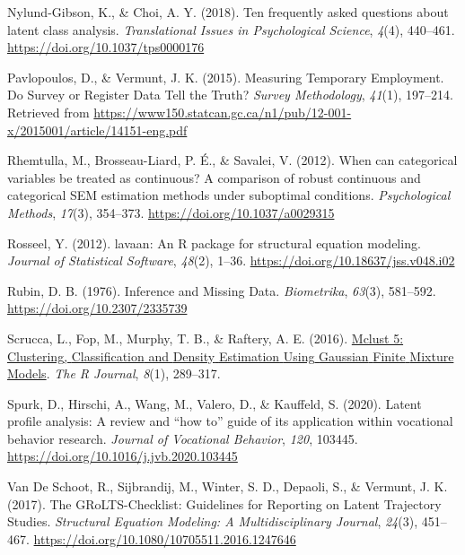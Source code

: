\documentclass[
  ,man,floatsintext]{apa6}
\newlength{\cslhangindent}
\newlength{\cslentryspacingunit} %
\newenvironment{CSLReferences}[2] %
 {%
  \setlength{\parindent}{0pt}
  \ifodd #1
  \let\oldpar\par
  \def\par{\hangindent=\cslhangindent\oldpar}
  \fi
  \setlength{\parskip}{#2\cslentryspacingunit}
 }%
 {}
\begin{document}
\begin{CSLReferences}{1}{0}
\leavevmode{}%
Nylund-Gibson, K., \& Choi, A. Y. (2018). Ten frequently asked questions about latent class analysis. \emph{Translational Issues in Psychological Science}, \emph{4}(4), 440--461. \url{https://doi.org/10.1037/tps0000176}

\leavevmode{}%
Pavlopoulos, D., \& Vermunt, J. K. (2015). Measuring {Temporary} {Employment}. {Do} {Survey} or {Register} {Data} {Tell} the {Truth}? \emph{Survey Methodology}, \emph{41}(1), 197--214. Retrieved from \url{https://www150.statcan.gc.ca/n1/pub/12-001-x/2015001/article/14151-eng.pdf}

\leavevmode{}%
Rhemtulla, M., Brosseau-Liard, P. É., \& Savalei, V. (2012). When can categorical variables be treated as continuous? {A} comparison of robust continuous and categorical {SEM} estimation methods under suboptimal conditions. \emph{Psychological Methods}, \emph{17}(3), 354--373. \url{https://doi.org/10.1037/a0029315}

\leavevmode{}%
Rosseel, Y. (2012). {lavaan}: An {R} package for structural equation modeling. \emph{Journal of Statistical Software}, \emph{48}(2), 1--36. \url{https://doi.org/10.18637/jss.v048.i02}

\leavevmode{}%
Rubin, D. B. (1976). Inference and {Missing} {Data}. \emph{Biometrika}, \emph{63}(3), 581--592. \url{https://doi.org/10.2307/2335739}

\leavevmode{}%
Scrucca, L., Fop, M., Murphy, T. B., \& Raftery, A. E. (2016). \href{https://www.ncbi.nlm.nih.gov/pmc/articles/PMC5096736}{Mclust 5: {Clustering}, {Classification} and {Density} {Estimation} {Using} {Gaussian} {Finite} {Mixture} {Models}}. \emph{The R Journal}, \emph{8}(1), 289--317.

\leavevmode{}%
Spurk, D., Hirschi, A., Wang, M., Valero, D., \& Kauffeld, S. (2020). Latent profile analysis: {A} review and {``how to''} guide of its application within vocational behavior research. \emph{Journal of Vocational Behavior}, \emph{120}, 103445. \url{https://doi.org/10.1016/j.jvb.2020.103445}

\leavevmode{}%
Van De Schoot, R., Sijbrandij, M., Winter, S. D., Depaoli, S., \& Vermunt, J. K. (2017). The {GRoLTS}-{Checklist}: {Guidelines} for {Reporting} on {Latent} {Trajectory} {Studies}. \emph{Structural Equation Modeling: A Multidisciplinary Journal}, \emph{24}(3), 451--467. \url{https://doi.org/10.1080/10705511.2016.1247646}


\end{CSLReferences}
\end{document}
